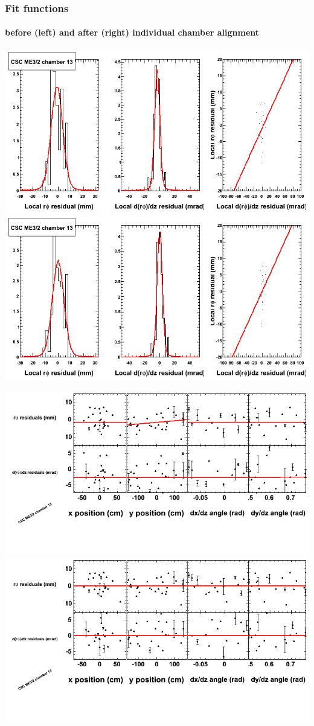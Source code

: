 \documentclass[compress]{beamer}
\begin{document}
\begin{frame}
\frametitle{Fit functions}
\framesubtitle{before (left) and after (right) individual chamber alignment}
\includegraphics[width=0.5\linewidth]{ringfits_3dof/beforefit_MEp32_13_bellcurve.png} \includegraphics[width=0.5\linewidth]{ringfits_3dof/afterfit_MEp32_13_bellcurve.png}

\includegraphics[width=0.5\linewidth]{ringfits_3dof/beforefit_MEp32_13_polynomials.png} \includegraphics[width=0.5\linewidth]{ringfits_3dof/afterfit_MEp32_13_polynomials.png}
\end{frame}
\end{document}
